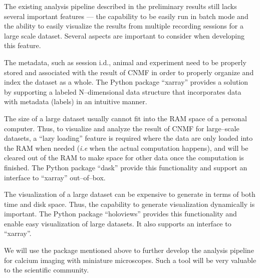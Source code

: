 \documentclass[master.tex]{subfiles}
\begin{document}
The existing analysis pipeline described in the preliminary results still lacks
several important features --- the capability to be easily run in batch mode and
the ability to easily visualize the results from multiple recording sessions for
a large scale dataset. Several aspects are important to consider when developing
this feature.
\begin{inparaenum}[a)]
\item The metadata, such as session i.d., animal and experiment need to be
  properly stored and associated with the result of CNMF in order to properly
  organize and index the dataset as a whole. The Python package ``xarray''
  provides a solution by supporting a labeled N--dimensional  data structure
  that incorporates data with metadata (labels) in an intuitive manner.
\item The size of a large dataset usually cannot fit into the RAM space of a
  personal computer. Thus, to visualize and analyze the result of CNMF for
  large--scale datasets, a ``lazy loading'' feature is required where the data
  are only loaded into the RAM when needed (\textit{i.e} when the actual
  computation happens), and will be cleared out of the RAM to make space for
  other data once the computation is finished. The Python package ``dask'' provide
  this functionality and support an interface to ``xarray'' out--of--box.
\item The visualization of a large dataset can be expensive to generate in terms
  of both time and disk space. Thus, the capability to generate visualization
  dynamically is important. The Python package ``holoviews'' provides this
  functionality and enable easy visualization of large datasets. It also supports
  an interface to ``xarray''.
\end{inparaenum}
We will use the package mentioned above to further develop the analysis pipeline
for calcium imaging with miniature microscopes. Such a tool will be very valuable
to the scientific community.
\end{document}
